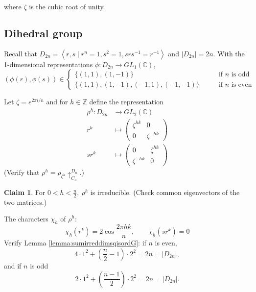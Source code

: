 \documentclass[a4paper]{article}
\newcommand{\la}{\left\langle}
\newcommand{\ra}{\right\rangle}
\newcommand{\Z}{\mathbb{Z}}
\newcommand{\C}{\mathbb{C}}
\theoremstyle{definition}
\newtheorem{claim}[defn]{Claim}
\begin{document}
where $\zeta$ is the cubic root of unity.

\subsection{Dihedral group}
Recall that $D_{2n}=\la r,s\mid r^n=1,s^2=1,srs^{-1}=r^{-1}\ra$ and $|D_{2n}|=2n$. With the 1-dimensional representations $\phi:D_{2n}\rightarrow GL_1(\C)$,
\[
(\phi(r),\phi(s))\in\left\{\begin{aligned}
\{(1,1),(1,-1)\} &\qquad\text{if }n\text{ is odd}\\
\{(1,1),(1,-1),(-1,1),(-1,-1)\} &\qquad\text{if }n\text{ is even}
\end{aligned} \right.
\]

Let $\zeta=e^{2\pi i/n}$ and for $h\in\Z$ define the representation
\[
\begin{aligned}
\rho^h:D_{2n}&\rightarrow GL_2(\C)\\
r^k&\mapsto\begin{pmatrix}
\zeta^{hk}&0\\0&\zeta^{-hk}
\end{pmatrix}\\
sr^k&\mapsto\begin{pmatrix}
0 & \zeta^{hk}\\\zeta^{-hk}&0
\end{pmatrix}
\end{aligned}
\]
(Verify that $\rho^h=\rho_{\zeta^h}\uparrow_{C_n}^{D_n}$.)
\begin{claim}
For $0<h<\frac{n}{2},\ \rho^h$ is irreducible. (Check common eigenvectors of the two matrices.)
\end{claim}
The characters $\chi_h$ of $\rho^h$:
\[
\chi_h(r^k)=2\cos\frac{2\pi hk}{n},\qquad \chi_h(sr^k)=0
\]
Verify Lemma \ref{lemma:sumirreddimsqisordG}: if $n$ is even, 
\[
4\cdot 1^2+\left(\frac{n}{2}-1\right)\cdot 2^2=2n=|D_{2n}|,
\]
and if $n$ is odd
\[
2\cdot 1^2+\left(\frac{n-1}{2}\right)\cdot 2^2=2n=|D_{2n}|.
\]
\end{document}
